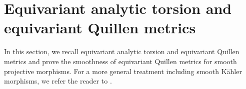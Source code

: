 \documentclass[amscd, leqno]{amsart}
\theoremstyle{plain}
\theoremstyle{definition}
\theoremstyle{remark}
\begin{document}
\section
{Equivariant analytic torsion and equivariant Quillen metrics}
\label{sect:1}
\par
In this section, we recall equivariant analytic torsion and equivariant Quillen metrics and prove the smoothness of 
equivariant Quillen metrics for smooth projective morphisms. 
For a more general treatment including smooth K\"ahler morphisms, we refer the reader to \cite[III, Sects.\,2 and 3]{BGS88}.




\end{document}

